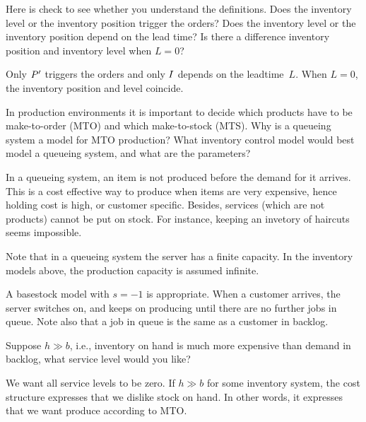 \documentclass[queueing-book.tex]{subfiles}
\begin{document}
\begin{exercise}
Here is check to see whether you understand the definitions.
Does the inventory level or the inventory position trigger the orders? Does the inventory level or the inventory position depend on the lead time?
Is there a difference inventory position and inventory level when $L=0$?
  \begin{solution}
    Only $P'$ triggers the orders and only $I$ depends on the leadtime~$L$. When $L=0$, the inventory position and level coincide.
  \end{solution}
\end{exercise}

\begin{exercise}
In production environments it is important to decide which products have to be make-to-order (MTO) and which make-to-stock (MTS). Why is a queueing system a model for MTO production? What inventory control model would best model a queueing system, and what are the parameters?
\begin{solution}
In a queueing system, an item is not produced before the demand for it arrives. This is a cost effective way to produce when items are very expensive, hence holding cost is high, or customer specific. Besides, services (which are not products) cannot be put on stock. For instance, keeping an invetory of haircuts seems impossible.

Note that in a queueing system the server has a finite capacity. In the inventory models above, the production capacity is assumed infinite.

A basestock model with $s=-1$ is appropriate. When a customer arrives, the server switches on, and keeps on producing until there are no further jobs in queue. Note also that a job in queue is the same as a customer in backlog.
\end{solution}
\end{exercise}


\begin{exercise}
  Suppose $h\gg b$, i.e.,  inventory on hand is much more expensive than demand in backlog, what service level would you like?
  \begin{solution}
    We want all service levels to be zero. If $h\gg b$ for some inventory system, the cost structure expresses that we dislike stock on hand. In other words, it expresses that we want produce according to MTO.
  \end{solution}
\end{exercise}
\end{document}
